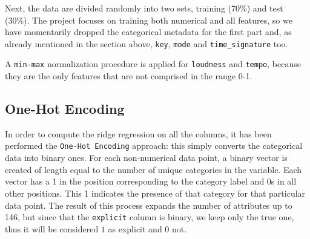 \documentclass{article}
\begin{document}
Next, the data are divided randomly into two sets, training (70\%) and test (30\%).
The project focuses on training both numerical and all features, so we have momentarily dropped the categorical metadata for the first part and, as already mentioned in the section above, \texttt{key}, \texttt{mode} and \texttt{time\_signature} too.
    
A \texttt{min-max} normalization procedure is applied for \texttt{loudness} and \texttt{tempo}, because they are the only features that are not comprised in the range 0-1.\newline
\subsection{One-Hot Encoding}
In order to compute the ridge regression on all the columns, it has been performed the \texttt{One-Hot Encoding} approach: this simply converts the categorical data into binary ones. For each non-numerical data point, a binary vector is created of length equal to the number of unique categories in the variable. Each vector has a 1 in the position corresponding to the category label and 0s in all other positions. This 1 indicates the presence of that category for that particular data point. The result of this process expands the number of attributes up to 146, but since that the \texttt{explicit} column is binary, we keep only the true one, thus it will be considered $1$ as explicit and $0$ not.
    
\end{document}
